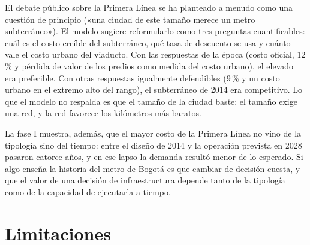 El debate público sobre la Primera Línea se ha planteado a menudo como una cuestión de principio
(«una ciudad de este tamaño merece un metro subterráneo»). El modelo sugiere reformularlo como tres
preguntas cuantificables: cuál es el costo creíble del subterráneo, qué tasa de descuento se usa y
cuánto vale el costo urbano del viaducto. Con las respuestas de la época (costo oficial, 12\,\% y
pérdida de valor de los predios como medida del costo urbano), el elevado era preferible. Con otras
respuestas igualmente defendibles (9\,\% y un costo urbano en el extremo alto del rango), el
subterráneo de 2014 era competitivo. Lo que el modelo no respalda es que el tamaño de la ciudad baste:
el tamaño exige una red, y la red favorece los kilómetros más baratos.

La fase I muestra, además, que el mayor costo de la Primera Línea no vino de la tipología sino del
tiempo: entre el diseño de 2014 y la operación prevista en 2028 pasaron catorce años, y en ese lapso la
demanda resultó menor de lo esperado. Si algo enseña la historia del metro de Bogotá es que cambiar de
decisión cuesta, y que el valor de una decisión de infraestructura depende tanto de la tipología como
de la capacidad de ejecutarla a tiempo.

\section{Limitaciones}

